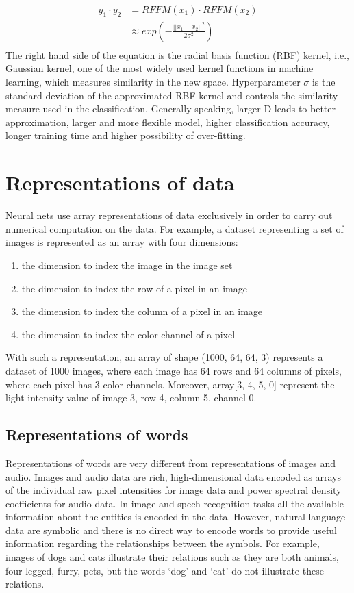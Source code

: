 \begin{align*}
	y_1 \cdot y_2
	&= RFFM(x_1) \cdot RFFM(x_2)\\
	&\approx exp(-\frac{||x_1-x_2||^2}{2\sigma^2})\\
\end{align*}
The right hand side of the equation is the radial basis function (RBF) kernel, i.e., Gaussian kernel, one of the most widely used kernel functions in machine learning, which measures similarity in the new space.
Hyperparameter $ \sigma $ is the standard deviation of the approximated RBF kernel and controls the similarity measure used in the classification.
Generally speaking, larger D leads to better approximation, larger and more flexible model, higher classification accuracy, longer training time and higher possibility of over-fitting.

\section{Representations of data}
Neural nets use array representations of data exclusively in order to carry out numerical computation on the data. For example, a dataset representing a set of images is represented as an array with four dimensions:
\begin{enumerate}
	\item the dimension to index the image in the image set
	\item the dimension to index the row of a pixel in an image
	\item the dimension to index the column of a pixel in an image
	\item the dimension to index the color channel of a pixel
\end{enumerate}
With such a representation, an array of shape (1000, 64, 64, 3) represents a dataset of 1000 images, where each image has 64 rows and 64 columns of pixels, where each pixel has 3 color channels.
Moreover, array[3, 4, 5, 0] represent the light intensity value of image 3, row 4, column 5, channel 0.

\subsection{Representations of words}
Representations of words are very different from representations of images and audio.
Images and audio data are rich, high-dimensional data encoded as arrays of the individual raw pixel intensities for image data and power spectral density coefficients for audio data.
In image and spech recognition tasks all the available information about the entities is encoded in the data.
However, natural language data are symbolic and there is no direct way to encode words to provide useful information regarding the relationships between the symbols.
For example, images of dogs and cats illustrate their relations such as they are both animals, four-legged, furry, pets, but the words `dog' and `cat' do not illustrate these relations.

